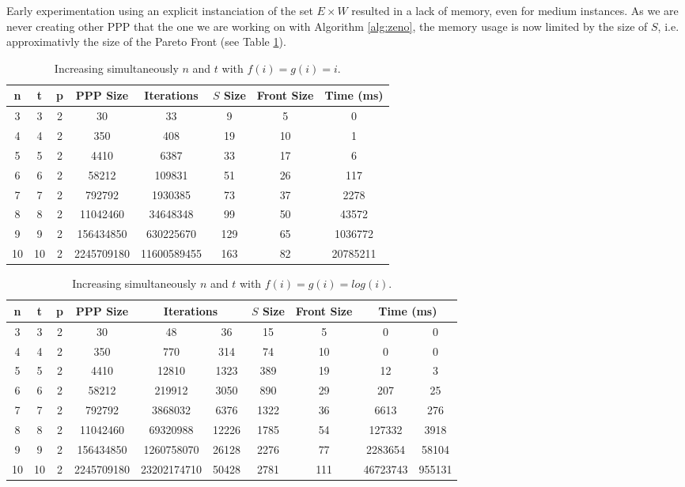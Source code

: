 \documentclass{llncs}
\begin{document}
Early experimentation using an explicit instanciation of the set $E \times W$ resulted in a lack of memory, even for medium instances. As we are never creating other PPP that the one we are working on with Algorithm \ref{alg:zeno}, the memory usage is now limited by the size of $S$, i.e. approximativly the size of the Pareto Front (see Table \ref{table:i}). 

\begin {table}[H]
\centering
\caption{\label{table:i} Increasing simultaneously $n$ and $t$ with $f(i)=g(i)=i$.}
\begin{tabular}{|c|c|c|c|c|c|c|c|}
  \hline
  n & t & p & PPP Size & Iterations & $S$ Size & Front Size & Time (ms)\\
  \hline
  3 & 3 & 2 & 30 & 33 & 9 & 5 & 0\\
  4 & 4 & 2 & 350 & 408 & 19 & 10 & 1\\
  5 & 5 & 2 & 4410 & 6387 & 33 & 17 & 6\\
  6 & 6 & 2 & 58212 & 109831 & 51 & 26 & 117\\
  7 & 7 & 2 & 792792 & 1930385 & 73 & 37 & 2278\\
  8 & 8 & 2 & 11042460 & 34648348 & 99 & 50 & 43572\\
  9 & 9 & 2 & 156434850 & 630225670 & 129 & 65 & 1036772 \\
  10 & 10 & 2 & 2245709180 & 11600589455 & 163 & 82 & 20785211 \\
  \hline
\end{tabular}
\end{table}

\begin {table}[H]
\centering
\caption{\label{table:loglog} Increasing simultaneously $n$ and $t$ with $f(i)=g(i)=log(i)$.}
\begin{tabular}{|c|c|c|c|c|c|c|c|c|c|}
  \hline
  n & t & p & PPP Size & \multicolumn{2}{c|}{Iterations} & $S$ Size & Front Size & \multicolumn{2}{c|}{Time (ms)} \\
  \hline
    3 & 3 & 2 & 30 & 48 & 36 & 15 & 5 & 0 & 0\\
    4 & 4 & 2 & 350 & 770 & 314 & 74 & 10 & 0 & 0\\
    5 & 5 & 2 & 4410 & 12810 & 1323 & 389 & 19 & 12 & 3\\
    6 & 6 & 2 & 58212 & 219912 & 3050 & 890 & 29 & 207 & 25\\
    7 & 7 & 2 & 792792 & 3868032 & 6376 & 1322 & 36 & 6613 & 276\\
    8 & 8 & 2 & 11042460 & 69320988 & 12226 & 1785 & 54 & 127332 & 3918\\
    9 & 9 & 2 & 156434850 & 1260758070 & 26128 & 2276 & 77 & 2283654 & 58104\\
    10 & 10 & 2 & 2245709180 & 23202174710 & 50428 & 2781 & 111 & 46723743 & 955131\\
  \hline
\end{tabular}
\end{table}
\end{document}
